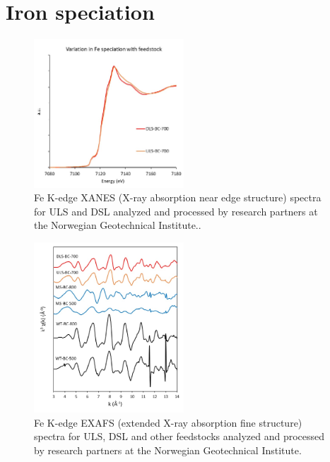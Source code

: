 \chapter{Iron speciation}\label{appSec:Fe}

\begin{figure}
    \centering
    \includegraphics[width=0.5\textwidth]{Diagrams/Valence.pdf}
    \caption{Fe K-edge XANES (X-ray absorption near edge structure) spectra for ULS and DSL analyzed and processed by research partners at the Norwegian Geotechnical Institute..}
    \label{appFig:valence}
\end{figure}

\begin{figure}
    \centering
    \includegraphics[width=0.5\textwidth]{Diagrams/Fe_species.pdf}
    \caption{Fe K-edge EXAFS (extended X-ray absorption fine structure) spectra for ULS, DSL and other feedstocks analyzed and processed by research partners at the Norwegian Geotechnical Institute.}
    \label{appFig:Fe_species}
\end{figure}